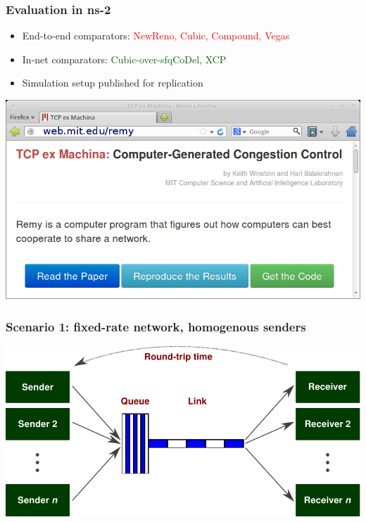 \documentclass[svgnames]{beamer}
\begin{document}
\begin{frame}
\frametitle{Evaluation in ns-2}

\begin{itemize}

\item End-to-end comparators: \textcolor{Red}{NewReno, Cubic, Compound, Vegas}

\item In-net comparators: \textcolor{DarkGreen}{Cubic-over-sfqCoDel, XCP}

\item Simulation setup published for replication

\end{itemize}

\begin{centering}
\includegraphics[width=9 cm]{reproducethis.png}

\end{centering}

\end{frame}

\begin{frame}
\frametitle{Scenario 1: fixed-rate network, homogenous senders}

\includegraphics[width=\textwidth]{dumbbell.pdf}

\end{frame}
\end{document}
